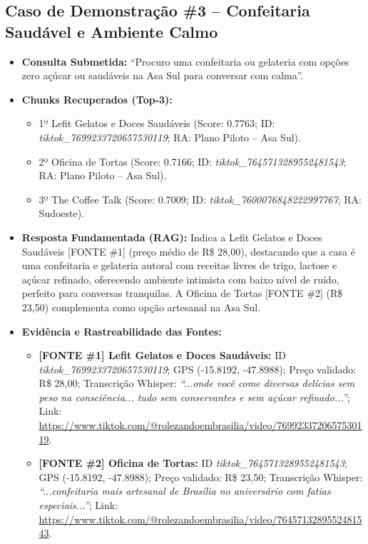\documentclass[12pt,a4paper]{article}
\begin{document}
\subsection{Caso de Demonstração \#3 -- Confeitaria Saudável e Ambiente Calmo}
\begin{itemize}[leftmargin=1.0cm]
\item \textbf{Consulta Submetida:} ``Procuro uma confeitaria ou gelateria com opções zero açúcar ou saudáveis na Asa Sul para conversar com calma''.
\item \textbf{Chunks Recuperados (Top-3):}
\begin{itemize}
\item 1º Lefit Gelatos e Doces Saudáveis (Score: 0.7763; ID: \textit{tiktok\_7699233720657530119}; RA: Plano Piloto -- Asa Sul).
\item 2º Oficina de Tortas (Score: 0.7166; ID: \textit{tiktok\_7645713289552481543}; RA: Plano Piloto -- Asa Sul).
\item 3º The Coffee Talk (Score: 0.7009; ID: \textit{tiktok\_7600076848222997767}; RA: Sudoeste).
\end{itemize}
\item \textbf{Resposta Fundamentada (RAG):} Indica a Lefit Gelatos e Doces Saudáveis [FONTE \#1] (preço médio de R\$ 28,00), destacando que a casa é uma confeitaria e gelateria autoral com receitas livres de trigo, lactose e açúcar refinado, oferecendo ambiente intimista com baixo nível de ruído, perfeito para conversas tranquilas. A Oficina de Tortas [FONTE \#2] (R\$ 23,50) complementa como opção artesanal na Asa Sul.
\item \textbf{Evidência e Rastreabilidade das Fontes:}
\begin{itemize}
\item \textbf{[FONTE \#1] Lefit Gelatos e Doces Saudáveis:} ID \textit{tiktok\_7699233720657530119}; GPS (-15.8192, -47.8988); Preço validado: R\$ 28,00; Transcrição Whisper: \textit{``...onde você come diversas delícias sem peso na consciência... tudo sem conservantes e sem açúcar refinado...''}; Link: \url{https://www.tiktok.com/@rolezandoembrasilia/video/7699233720657530119}.
\item \textbf{[FONTE \#2] Oficina de Tortas:} ID \textit{tiktok\_7645713289552481543}; GPS (-15.8192, -47.8988); Preço validado: R\$ 23,50; Transcrição Whisper: \textit{``...confeitaria mais artesanal de Brasília no aniversário com fatias especiais...''}; Link: \url{https://www.tiktok.com/@rolezandoembrasilia/video/7645713289552481543}.
\end{itemize}
\end{itemize}
\end{document}

